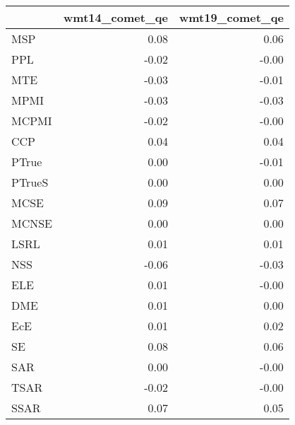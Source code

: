 \begin{tabular}{lrr}
\toprule
 & wmt14\_comet\_qe & wmt19\_comet\_qe \\
\midrule
MSP & 0.08 & 0.06 \\
PPL & -0.02 & -0.00 \\
MTE & -0.03 & -0.01 \\
MPMI & -0.03 & -0.03 \\
MCPMI & -0.02 & -0.00 \\
CCP & 0.04 & 0.04 \\
PTrue & 0.00 & -0.01 \\
PTrueS & 0.00 & 0.00 \\
MCSE & 0.09 & 0.07 \\
MCNSE & 0.00 & 0.00 \\
LSRL & 0.01 & 0.01 \\
NSS & -0.06 & -0.03 \\
ELE & 0.01 & -0.00 \\
DME & 0.01 & 0.00 \\
EcE & 0.01 & 0.02 \\
SE & 0.08 & 0.06 \\
SAR & 0.00 & -0.00 \\
TSAR & -0.02 & -0.00 \\
SSAR & 0.07 & 0.05 \\
\bottomrule
\end{tabular}
